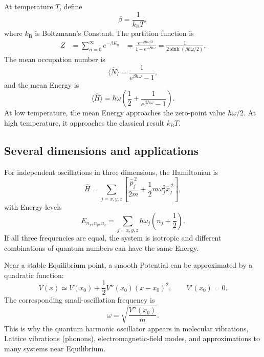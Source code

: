 \documentclass[a4paper, 10pt, onepage]{elegantbook}
\begin{document}
{\noindent

At temperature $T$, define
\begin{equation}
  \beta=\frac{1}{k_{\mathrm B}T},
\end{equation}
where $k_{\mathrm B}$ is Boltzmann's Constant. The partition function
is
\begin{align}
  Z
  &=\sum_{n=0}^{\infty}e^{-\beta E_n}
  &=\frac{e^{-\beta\hbar\omega/2}}
          {1-e^{-\beta\hbar\omega}}
   =\frac{1}{2\sinh(\beta\hbar\omega/2)}.
\end{align}
The mean occupation number is
\begin{equation}
  \langle\hat{N}\rangle
  =\frac{1}{e^{\beta\hbar\omega}-1},
\end{equation}
and the mean Energy is
\begin{equation}
  \langle\hat{H}\rangle
  =\hbar\omega\left(
     \frac{1}{2}+\frac{1}{e^{\beta\hbar\omega}-1}
   \right).
\end{equation}
At low temperature, the mean Energy approaches the zero-point value
$\hbar\omega/2$. At high temperature, it approaches the classical
result $k_{\mathrm B}T$.

\subsection{Several dimensions and applications}

\noindent


For independent oscillations in three dimensions, the Hamiltonian is
\begin{equation}
  \hat{H}
  =\sum_{j=x,y,z}
   \left[
    \frac{\hat{p}_j^{\,2}}{2m}
    +\frac{1}{2}m\omega_j^2\hat{x}_j^{\,2}
   \right],
\end{equation}
with Energy levels
\begin{equation}
  E_{n_x,n_y,n_z}
  =\sum_{j=x,y,z}\hbar\omega_j
   \left(n_j+\frac{1}{2}\right).
\end{equation}
If all three frequencies are equal, the system is isotropic and
different combinations of quantum numbers can have the same Energy.

Near a stable Equilibrium point, a smooth Potential can be
approximated by a quadratic function:
\begin{equation}
  V(x)\simeq V(x_0)
  +\frac{1}{2}V''(x_0)(x-x_0)^2,
  \qquad V'(x_0)=0.
\end{equation}
The corresponding small-oscillation frequency is
\begin{equation}
  \omega=\sqrt{\frac{V''(x_0)}{m}}.
\end{equation}
This is why the quantum harmonic oscillator appears in molecular
vibrations, Lattice vibrations (phonons), electromagnetic-field
modes, and approximations to many systems near Equilibrium.

}
\end{document}
